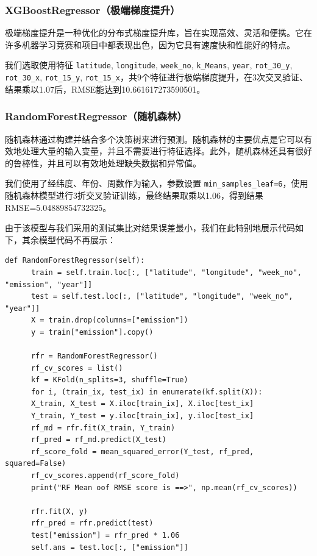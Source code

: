 \documentclass{ctexart}
\begin{document}
\subsubsection{XGBoostRegressor（极端梯度提升）}

极端梯度提升是一种优化的分布式梯度提升库，旨在实现高效、灵活和便携。它在许多机器学习竞赛和项目中都表现出色，因为它具有速度快和性能好的特点。

我们选取使用特征 \texttt{latitude}, \texttt{longitude}, \texttt{week\_no}, \texttt{k\_Means}, \texttt{year}, \texttt{rot\_30\_y}, \texttt{rot\_30\_x}, \texttt{rot\_15\_y}, \texttt{rot\_15\_x}，共9个特征进行极端梯度提升，在3次交叉验证、结果乘以1.07后，RMSE能达到10.661617273590501。

\subsubsection{RandomForestRegressor（随机森林）}

随机森林通过构建并结合多个决策树来进行预测。随机森林的主要优点是它可以有效地处理大量的输入变量，并且不需要进行特征选择。此外，随机森林还具有很好的鲁棒性，并且可以有效地处理缺失数据和异常值。

我们使用了经纬度、年份、周数作为输入，参数设置 \texttt{min\_samples\_leaf=6}，使用随机森林模型进行3折交叉验证训练，最终结果取乘以1.06，得到结果RMSE=5.04889854732325。

由于该模型与我们采用的测试集比对结果误差最小，我们在此特别地展示代码如下，其余模型代码不再展示：

\begin{lstlisting}[style=Python]
def RandomForestRegressor(self):
      train = self.train.loc[:, ["latitude", "longitude", "week_no", "emission", "year"]]
      test = self.test.loc[:, ["latitude", "longitude", "week_no", "year"]]
      X = train.drop(columns=["emission"])
      y = train["emission"].copy()

      rfr = RandomForestRegressor()
      rf_cv_scores = list()
      kf = KFold(n_splits=3, shuffle=True)
      for i, (train_ix, test_ix) in enumerate(kf.split(X)):
      X_train, X_test = X.iloc[train_ix], X.iloc[test_ix]
      Y_train, Y_test = y.iloc[train_ix], y.iloc[test_ix]
      rf_md = rfr.fit(X_train, Y_train)
      rf_pred = rf_md.predict(X_test)
      rf_score_fold = mean_squared_error(Y_test, rf_pred, squared=False)
      rf_cv_scores.append(rf_score_fold)
      print("RF Mean oof RMSE score is ==>", np.mean(rf_cv_scores))

      rfr.fit(X, y)
      rfr_pred = rfr.predict(test)
      test["emission"] = rfr_pred * 1.06
      self.ans = test.loc[:, ["emission"]]
\end{lstlisting}
\end{document}
